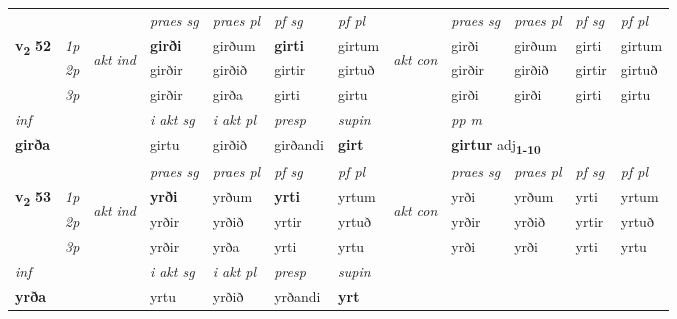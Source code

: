 \begin{longtable}[l]{X>{\footnotesize\itshape}llXXXXlXXXX}
 & &   & \textit{praes sg}  & \textit{praes pl}    & \textit{ pf sg} & \textit{pf pl} & & \textit{praes sg}  & \textit{praes pl}    & \textit{pf sg} & \textit{pf pl }  \\ \cmidrule{4-7} \cmidrule{9-12}
 \multirow{2}{*}{{{\textbf{v{\textsubscript{2}}} \Large{\textbf{52}}}}}  & 1p & \multirow{3}{*}{\begin{turn}{90}\textit{akt ind}\end{turn}} & \textbf{girði} & girðum & \textbf{girti} & girtum & \multirow{3}{*}{\begin{turn}{90}\textit{akt con}\end{turn}} &girði & girðum & girti & girtum\\*
 & 2p &  &  girðir  & girðið & girtir & girtuð & & girðir & girðið & girtir & girtuð \\*
 & 3p &  & girðir & girða & girti & girtu & & girði & girði& girti & girtu \\*
\cmidrule{4-7} \cmidrule{9-12}

   {\textit{inf}} & &  & \textit{i akt sg} & \textit{i akt pl}   & \textit{presp} & \textit{supin}  && \textit{pp m} \\*
  {\textbf{girða}} & && girtu  & girðið   & girðandi &  \textbf{girt}  && \multicolumn{2}{l}{\textbf{girtur} adj\textbf{\textsubscript{1-10}}} \\*

\midrule

 & &   & \textit{praes sg}  & \textit{praes pl}    & \textit{ pf sg} & \textit{pf pl} & & \textit{praes sg}  & \textit{praes pl}    & \textit{pf sg} & \textit{pf pl }  \\ \cmidrule{4-7} \cmidrule{9-12}
 \multirow{2}{*}{{{\textbf{v{\textsubscript{2}}} \Large{\textbf{53}}}}}  & 1p & \multirow{3}{*}{\begin{turn}{90}\textit{akt ind}\end{turn}} & \textbf{yrði} & yrðum & \textbf{yrti} & yrtum & \multirow{3}{*}{\begin{turn}{90}\textit{akt con}\end{turn}} &yrði & yrðum & yrti & yrtum\\*
 & 2p &  &  yrðir  & yrðið & yrtir & yrtuð & & yrðir & yrðið & yrtir & yrtuð \\*
 & 3p &  & yrðir & yrða & yrti & yrtu & & yrði & yrði& yrti & yrtu \\*
\cmidrule{4-7} \cmidrule{9-12}

   {\textit{inf}} & &  & \textit{i akt sg} & \textit{i akt pl}   & \textit{presp} & \textit{supin}   \\*
  {\textbf{yrða}} & && yrtu  & yrðið   & yrðandi &  \textbf{yrt}   \\*


\end{longtable}
